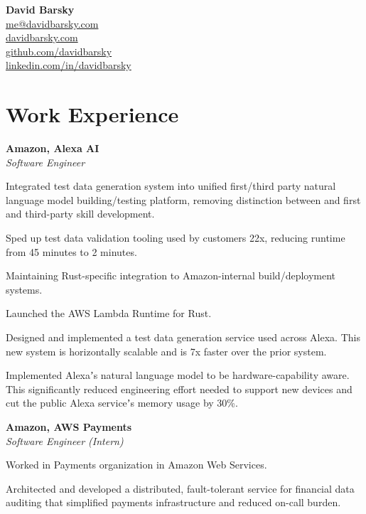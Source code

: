 \documentclass[10pt, a4paper]{article}
\newcommand{\note}[1]{\marginnote{\scriptsize #1}}
\renewenvironment{itemize}[1]{\begin{compactitem}#1}{\end{compactitem}}
\begin{document}
{\LARGE\textbf{David Barsky}}\\[.2cm]

\href{mailto:me@davidbarsky.com}{me@davidbarsky.com}\\
\href{http://davidbarsky.com}{davidbarsky.com}\\
\href{http://github.com/davidbarsky}{github.com/davidbarsky}\\
\href{http://linkedin.com/in/davidbarsky}{linkedin.com/in/davidbarsky}

\section*{\textbf{Work Experience}}

\note{Fall 2017–Present}
\textbf{Amazon, Alexa AI} \\
\emph{Software Engineer}
\begin{itemize}
	\item Integrated test data generation system into unified first/third party natural language model building/testing platform, removing distinction between and first and third-party skill development.
	\item Sped up test data validation tooling used by customers 22x, reducing runtime from 45 minutes to 2 minutes.
	\item Maintaining Rust-specific integration to Amazon-internal build/deployment systems.
    \item Launched the AWS Lambda Runtime for Rust.
	\item Designed and implemented a test data generation service used across Alexa. This new system is horizontally scalable and is 7x faster over the prior system.
    \item Implemented Alexaʼs natural language model to be hardware-capability aware. This significantly reduced engineering effort needed to support new devices and cut the public Alexa serviceʼs memory usage by 30\%. 
\end{itemize}

\note{Summer 2016}
\textbf{Amazon, AWS Payments} \\
\emph{Software Engineer (Intern)}
\begin{itemize}
	\item Worked in Payments organization in Amazon Web Services.
    \item Architected and developed a distributed, fault-tolerant service for financial data auditing that simplified payments infrastructure and reduced on-call burden.
\end{itemize}
\end{document}
